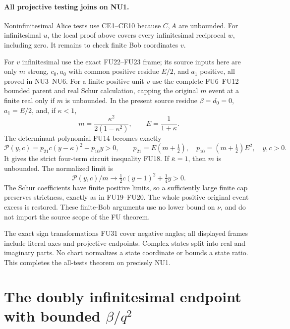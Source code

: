 \paragraph{All projective testing joins on NU1.}
Noninfinitesimal Alice tests use CE1--CE10 because $C,A$ are
unbounded. For infinitesimal $u$, the local proof above covers
every infinitesimal reciprocal $w$, including zero. It remains
to check finite Bob coordinates $v$.

For $v$ infinitesimal use the exact FU22--FU23 frame; its source
inputs here are only $m$ strong, $c_0,a_0$ with common positive
residue $E/2$, and $a_1$ positive, all proved in NU3--NU6.
For a finite positive unit $v$ use the complete FU6--FU12
bounded parent and real Schur calculation, capping the original
$m$ event at a finite real only if $m$ is unbounded. In the
present source residue $\beta=d_0=0$, $a_1=E/2$, and, if
$\kappa<1$,
\[
 m=\frac{\kappa^2}{2(1-\kappa^2)},\qquad E=\frac1{1+\kappa}.
 \tag{NU24}
\]
The determinant polynomial FU14 becomes exactly
\[
 \mathcal P(y,c)=p_{21}c(y-\kappa)^2+p_{10}y>0,
 \qquad p_{21}=E(m+\tfrac12),\quad
 p_{10}=(m+\tfrac12)E^2,\quad y,c>0.
 \tag{NU25}
\]
It gives the strict four-term circuit inequality FU18. If
$\bar\kappa=1$, then $m$ is unbounded. The normalized limit is
\[
 \mathcal P(y,c)/m\longrightarrow
              \tfrac12c(y-1)^2+\tfrac14y>0.
 \tag{NU26}
\]
The Schur coefficients have finite positive limits, so a
sufficiently large finite cap preserves strictness, exactly as
in FU19--FU20. The whole positive original event excess is
restored. These finite-Bob arguments use no lower bound on
$\nu$, and do not import the source scope of the FU theorem.

The exact sign transformations FU31 cover negative angles;
all displayed frames include literal axes and projective
endpoints. Complex states split into real and imaginary parts.
No chart normalizes a state coordinate or bounds a state ratio.
This completes the all-tests theorem on precisely NU1.


\section{\texorpdfstring{The doubly infinitesimal endpoint with bounded $\beta/q^2$}{The doubly infinitesimal endpoint with bounded beta/q2}}
\label{component:p1de5b12d1927}

\label{p1de5b12d1927:sec:new-c144-small-nu-bounded-beta}

